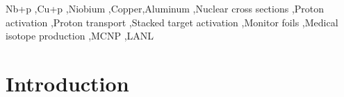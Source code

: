 \documentclass[3p]{elsarticle}
\newcommand{\comment}[1]{\todo[color=blue!20!white,inline]{ASV: #1}}
\begin{document}
\begin{frontmatter}
\begin{abstract}



\end{abstract}

\begin{keyword}
Nb+p \sep Cu+p \sep Niobium \sep Copper\sep Aluminum \sep Nuclear cross sections \sep Proton activation \sep Proton transport \sep Stacked target activation \sep Monitor foils \sep Medical isotope production \sep MCNP \sep  LANL


\end{keyword}

\end{frontmatter}

\listoftodos


\linenumbers



\section{Introduction} \label{sec:intro}

\end{document}
